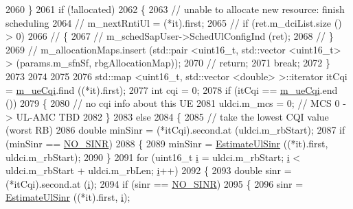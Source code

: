 \begin{DoxyCode}
2060         \}
2061       \textcolor{keywordflow}{if} (!allocated)
2062         \{
2063           \textcolor{comment}{// unable to allocate new resource: finish scheduling}
2064 \textcolor{comment}{//          m\_nextRntiUl = (*it).first;}
2065 \textcolor{comment}{//          if (ret.m\_dciList.size () > 0)}
2066 \textcolor{comment}{//            \{}
2067 \textcolor{comment}{//              m\_schedSapUser->SchedUlConfigInd (ret);}
2068 \textcolor{comment}{//            \}}
2069 \textcolor{comment}{//          m\_allocationMaps.insert (std::pair <uint16\_t, std::vector <uint16\_t> > (params.m\_sfnSf,
       rbgAllocationMap));}
2070 \textcolor{comment}{//          return;}
2071           \textcolor{keywordflow}{break};
2072         \}
2073 
2074 
2075 
2076       std::map <uint16\_t, std::vector <double> >::iterator itCqi = \hyperlink{classns3_1_1PssFfMacScheduler_abd1f917911a86bfd576e93ec67d7b8b2}{m\_ueCqi}.find ((*it).first);
2077       \textcolor{keywordtype}{int} cqi = 0;
2078       \textcolor{keywordflow}{if} (itCqi == \hyperlink{classns3_1_1PssFfMacScheduler_abd1f917911a86bfd576e93ec67d7b8b2}{m\_ueCqi}.end ())
2079         \{
2080           \textcolor{comment}{// no cqi info about this UE}
2081           uldci.m\_mcs = 0; \textcolor{comment}{// MCS 0 -> UL-AMC TBD}
2082         \}
2083       \textcolor{keywordflow}{else}
2084         \{
2085           \textcolor{comment}{// take the lowest CQI value (worst RB)}
2086           \textcolor{keywordtype}{double} minSinr = (*itCqi).second.at (uldci.m\_rbStart);
2087           \textcolor{keywordflow}{if} (minSinr == \hyperlink{cqa-ff-mac-scheduler_8h_a520d71777be043568160c783a9c65fd5}{NO\_SINR})
2088             \{
2089               minSinr = \hyperlink{classns3_1_1PssFfMacScheduler_a15bdac925576b1d79d0c8a8eb3cc54b8}{EstimateUlSinr} ((*it).first, uldci.m\_rbStart);
2090             \}
2091           \textcolor{keywordflow}{for} (uint16\_t \hyperlink{bernuolliDistribution_8m_a6f6ccfcf58b31cb6412107d9d5281426}{i} = uldci.m\_rbStart; \hyperlink{bernuolliDistribution_8m_a6f6ccfcf58b31cb6412107d9d5281426}{i} < uldci.m\_rbStart + uldci.m\_rbLen; 
      \hyperlink{bernuolliDistribution_8m_a6f6ccfcf58b31cb6412107d9d5281426}{i}++)
2092             \{
2093               \textcolor{keywordtype}{double} sinr = (*itCqi).second.at (\hyperlink{bernuolliDistribution_8m_a6f6ccfcf58b31cb6412107d9d5281426}{i});
2094               \textcolor{keywordflow}{if} (sinr == \hyperlink{cqa-ff-mac-scheduler_8h_a520d71777be043568160c783a9c65fd5}{NO\_SINR})
2095                 \{
2096                   sinr = \hyperlink{classns3_1_1PssFfMacScheduler_a15bdac925576b1d79d0c8a8eb3cc54b8}{EstimateUlSinr} ((*it).first, \hyperlink{bernuolliDistribution_8m_a6f6ccfcf58b31cb6412107d9d5281426}{i});

\end{DoxyCode}
